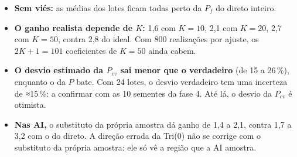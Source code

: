 \documentclass[11pt,a4paper]{article}
\begin{document}
\begin{itemize}
  \item \textbf{Sem viés:} as médias dos lotes ficam todas perto da $P_f$ do direto inteiro.
  \item \textbf{O ganho realista depende de $K$:} 1{,}6 com $K = 10$, 2{,}1 com $K = 20$, 2{,}7 com $K = 50$,
    contra 2{,}8 do ideal. Com 800 realizações por ajuste, os $2K + 1 = 101$
    coeficientes de $K = 50$ ainda cabem.
  \item \textbf{O desvio estimado da $P_{cv}$ sai menor que o verdadeiro} (de 15 a 26\,\%), enquanto o da
    $P$ bate. Com 24 lotes, o desvio verdadeiro tem uma incerteza de ≈15\,\%:
    a confirmar com as 10 sementes da fase 4. Até lá, o desvio da $P_{cv}$ é otimista.
  \item \textbf{Nas AI,} o substituto da própria amostra dá ganho de 1{,}4 a 2{,}1, contra 1{,}7 a 3{,}2 com o
    do direto. A direção errada da Tri(0) não se corrige com o substituto da própria amostra: ele só vê a região que a AI
    amostra.
\end{itemize}
\end{document}
